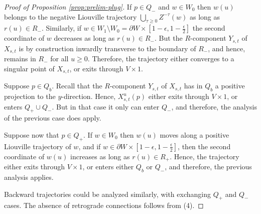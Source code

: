 \documentclass[12pt]{amsart}
\theoremstyle{plain}
\theoremstyle{definition}
\theoremstyle{remark}
\newcommand{\eps}{\epsilon}
\newcommand{\p}{\partial}
\begin{document}
\begin{proof}[Proof of Proposition \ref{prop:prelim-plug}]
 If $p\in Q_-$ and $w\in W_0$ then $w(u)$  belongs to the negative Liouville trajectory $\bigcup\limits_{\tau\geq 0}Z^{-\tau}(w)$ as long as $r(u)\in R_-$.
 Similarly, if $w\in W_1\setminus W_0=\p W\times[1-\eps,1-\frac\eps2]$ the second coordinate of $w$ decreases as long as $r(u)\in R_-$.
But  the $R$-component $Y_{s,t}$  of $X_{s,t}$ is by construction inwardly transverse to the boundary of $R_-$, and hence,  remains in $R_-$ for all $u\geq 0$. Therefore, the trajectory either converges to a singular point of $X_{s,t}$, or exits through $V\times 1$.

Suppose $p\in Q_b$. Recall that the  $R$-component $Y_{s,t}$  of $X_{s,t}$ has in $Q_b$ a positive projection to  the  $y$-direction. Hence,  $X_{s,t}^u(p)$  either  exits through $V\times 1$, or enters $Q_+\cup Q_-$. But  in that case it only can enter $Q_-$, and therefore, the analysis of the previous case does apply.
 
 Suppose now that $p\in Q_+$.    If $w\in W_0$ then $w(u)$ moves along a positive Liouville trajectory of $w$, and if  $w\in \p W\times [1-\eps ,1-\frac\eps2]$,  then the second coordinate of $w(u)$ increases   as long as $r(u)\in R_+$. Hence, the trajectory either exits through $V\times 1$, or  enters either $Q_b$ or $Q_-$, and therefore, the previous analysis applies.
 
  Backward trajectories could be analyzed  similarly, with exchanging $Q_+$ and $Q_-$ cases.
 The absence of retrograde connections follows from (4).
 

 \end{proof}
\end{document}
